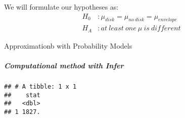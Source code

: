 \documentclass[]{article}
\newenvironment{Shaded}{\begin{snugshade}}{\end{snugshade}}
\newcommand{\DataTypeTok}[1]{\textcolor[rgb]{0.13,0.29,0.53}{#1}}
\newcommand{\DecValTok}[1]{\textcolor[rgb]{0.00,0.00,0.81}{#1}}
\newcommand{\KeywordTok}[1]{\textcolor[rgb]{0.13,0.29,0.53}{\textbf{#1}}}
\newcommand{\NormalTok}[1]{#1}
\newcommand{\OperatorTok}[1]{\textcolor[rgb]{0.81,0.36,0.00}{\textbf{#1}}}
\newcommand{\StringTok}[1]{\textcolor[rgb]{0.31,0.60,0.02}{#1}}
\let\oldsubparagraph\subparagraph
\renewcommand{\subparagraph}[1]{\oldsubparagraph{#1}\mbox{}}
\begin{document}
We will formulate our hypotheses as: \[
\begin{aligned}
H_{0} &: \mu_{disk}  = \mu_{no~disk} = \mu_{envelope}  \\
H_{A} &: at~least~one~\mu~is~different
\end{aligned}
\]

Approximationb with Probability Models

\hypertarget{computational-method-with-infer-5}{%
\subparagraph{Computational method with
Infer}\label{computational-method-with-infer-5}}

\begin{Shaded}
\end{Shaded}

\begin{verbatim}
## # A tibble: 1 x 1
##    stat
##   <dbl>
## 1 1827.
\end{verbatim}

\begin{Shaded}
\end{Shaded}
\end{document}
